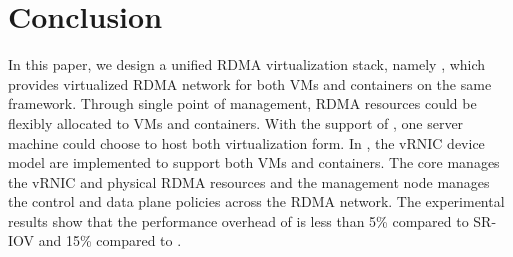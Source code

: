 \section{Conclusion} \label{conclusion}
In this paper, we design a unified RDMA virtualization stack, namely \sys, which provides virtualized RDMA network for both VMs and containers on the same framework.
Through single point of management, RDMA resources could be flexibly allocated to VMs and containers. With the support of \sys, one server machine could choose to host both virtualization form.
In \sys, the vRNIC device model are implemented to support both VMs and containers. The \sys core manages the vRNIC and physical RDMA resources and the management node manages the control and data plane policies across the RDMA network. The experimental results show that the performance overhead of \sys is less than 5\% compared to SR-IOV and 15\% compared to \native.
